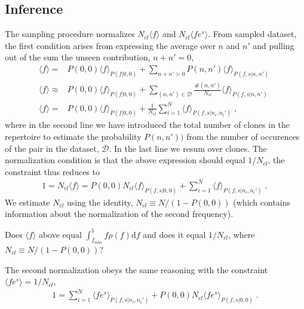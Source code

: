 \documentclass[letterpaper,english,prl,reprint,onecolumn]{revtex4-1} %
\begin{document}
\subsection*{Inference}
The sampling procedure normalizes $N_{cl}\langle f \rangle$ and $N_{cl}\langle fe^s \rangle$. From sampled dataset, the first condition arises from expressing the average over $n$ and $n'$ and pulling out of the sum the unseen contribution, $n+n'=0$,
\begin{align*}
	\langle f \rangle =&P(0,0) \langle f\rangle_{P(f|0,0)}+\sum_{n+n'>0}P(n,n')\langle f\rangle_{P(f,s|n,n')} \;\\
	\langle f \rangle \approx&P(0,0) \langle f\rangle_{P(f|0,0)}+\sum_{(n,n')\in\mathcal{D}}\frac{\#(n,n')}{N_{cl}}\langle f\rangle_{P(f,s|n,n')} \;\\
	\langle f \rangle =&P(0,0) \langle f\rangle_{P(f|0,0)}+\frac{1}{N_{cl}}\sum_{i=1}^{N} \langle f\rangle_{P(f,s|n_i,n_i')} \;,
\end{align*}
where in the second line we have introduced the total number of clones in the repertoire to estimate the probability $P(n,n'))$ from the number of occurences of the pair in the dataset, $\mathcal{D}$. In the last line we resum over clones. The normalization condition is that the above expression should equal $1/N_{cl}$, the constraint thus reduces to 
\begin{align*}
	1=N_{cl}\langle f \rangle=P(0,0)N_{cl}\langle f\rangle_{P(f,s|0,0)}+\sum_{i=1}^{N} \langle f\rangle_{P(f,s|n_i,n_i')} \;,
\end{align*}
We estimate $N_{cl}$ using the identity, $N_{cl}\equiv N/(1-P(0,0))$ (which contains information about the normalization of the second frequency).

Does $\langle f \rangle$ above equal $\int_{f_{min}}^1 f\rho(f)\textrm{d}f$ and does it equal $1/N_{cl}$, where $N_{cl}\equiv N/(1-P(0,0))$? 

The second normalization obeys the same reasoning with the constraint  $\langle fe^s \rangle=1/N_{cl}$, 
\begin{align*}
	1 =\sum_{i=1}^{N} \langle fe^s\rangle_{P(f,s|n_i,n_i')} + P(0,0) N_{cl}\langle fe^s\rangle_{P(f,s|0,0)}\;.
\end{align*}


\newpage
\end{document}
